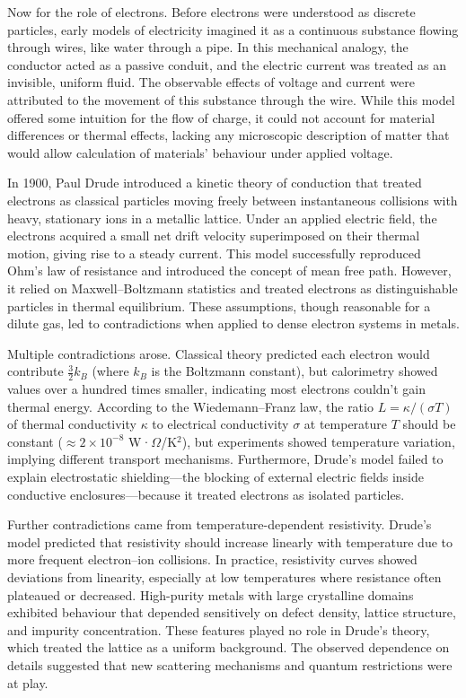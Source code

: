 Now for the role of electrons. Before electrons were understood as discrete particles, early models of electricity imagined it as a continuous substance flowing through wires, like water through a pipe. In this mechanical analogy, the conductor acted as a passive conduit, and the electric current was treated as an invisible, uniform fluid. The observable effects of voltage and current were attributed to the movement of this substance through the wire. While this model offered some intuition for the flow of charge, it could not account for material differences or thermal effects, lacking any microscopic description of matter that would allow calculation of materials' behaviour under applied voltage.

In 1900, Paul Drude introduced a kinetic theory of conduction that treated electrons as classical particles moving freely between instantaneous collisions with heavy, stationary ions in a metallic lattice. Under an applied electric field, the electrons acquired a small net drift velocity superimposed on their thermal motion, giving rise to a steady current. This model successfully reproduced Ohm's law of resistance and introduced the concept of mean free path. However, it relied on Maxwell–Boltzmann statistics and treated electrons as distinguishable particles in thermal equilibrium. These assumptions, though reasonable for a dilute gas, led to contradictions when applied to dense electron systems in metals.

Multiple contradictions arose. Classical theory predicted each electron would contribute $\tfrac{3}{2}k_B$ (where $k_B$ is the Boltzmann constant), but calorimetry showed values over a hundred times smaller, indicating most electrons couldn't gain thermal energy. According to the Wiedemann–Franz law, the ratio $L = \kappa / (\sigma T)$ of thermal conductivity $\kappa$ to electrical conductivity $\sigma$ at temperature $T$ should be constant ($\approx 2 \times 10^{-8}$ W·$\Omega$/K$^2$), but experiments showed temperature variation, implying different transport mechanisms. Furthermore, Drude's model failed to explain electrostatic shielding—the blocking of external electric fields inside conductive enclosures—because it treated electrons as isolated particles.

Further contradictions came from temperature-dependent resistivity. Drude's model predicted that resistivity should increase linearly with temperature due to more frequent electron–ion collisions. In practice, resistivity curves showed deviations from linearity, especially at low temperatures where resistance often plateaued or decreased. High-purity metals with large crystalline domains exhibited behaviour that depended sensitively on defect density, lattice structure, and impurity concentration. These features played no role in Drude's theory, which treated the lattice as a uniform background. The observed dependence on details suggested that new scattering mechanisms and quantum restrictions were at play.

